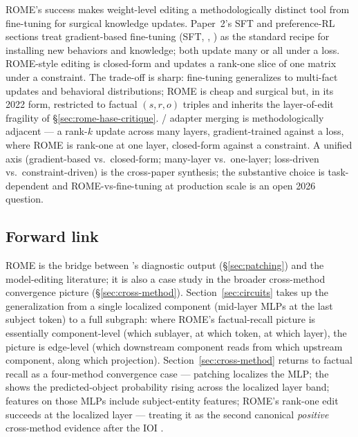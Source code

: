 ROME's success makes weight-level editing a methodologically distinct
tool from fine-tuning for surgical knowledge updates. Paper~2's SFT
and preference-RL sections treat gradient-based fine-tuning (SFT,
, ) as the standard recipe for installing new behaviors and
knowledge; both update many or all  under a loss.
ROME-style editing is closed-form and updates a rank-one slice of one
matrix under a constraint. The trade-off is sharp: fine-tuning
generalizes to multi-fact updates and behavioral distributions; ROME
is cheap and surgical but, in its 2022 form, restricted to factual
$(s, r, o)$ triples and inherits the layer-of-edit fragility of
\S\ref{sec:rome-hase-critique}. / adapter merging
\citep[Paper 2 §parameter-efficient-finetuning]{} is methodologically
adjacent --- a rank-$k$ update across many layers, gradient-trained
against a loss, where ROME is rank-one at one layer, closed-form
against a constraint. A unified axis (gradient-based vs.\ closed-form;
many-layer vs.\ one-layer; loss-driven vs.\ constraint-driven) is the
cross-paper synthesis; the substantive choice is task-dependent and
ROME-vs-fine-tuning at production scale is an open 2026 question.

\subsection{Forward link}
\label{sec:rome-forward}

ROME is the bridge between 's diagnostic output
(\S\ref{sec:patching}) and the model-editing literature; it is also a
case study in the broader cross-method convergence picture
(\S\ref{sec:cross-method}). Section~\ref{sec:circuits} takes up the
generalization from a single localized component (mid-layer MLPs at
the last subject token) to a full  subgraph: where ROME's
factual-recall picture is essentially component-level (which sublayer,
at which token, at which layer), the  picture is
edge-level (which downstream component reads from which upstream
component, along which projection). Section~\ref{sec:cross-method}
returns to factual recall as a four-method convergence case ---
patching localizes the MLP; the  shows the predicted-object
probability rising across the localized layer band;  features on
those MLPs include subject-entity features; ROME's rank-one edit
succeeds at the localized layer --- treating it as the second canonical
\emph{positive} cross-method evidence after the IOI .
